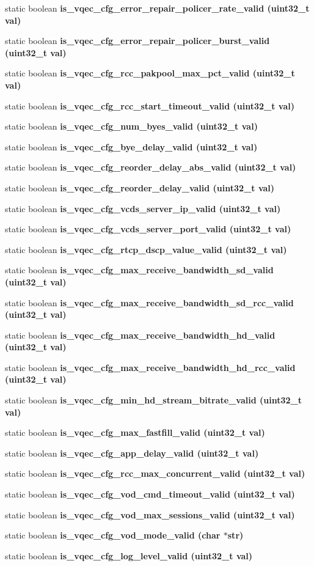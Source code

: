 \begin{CompactItemize}
static boolean \bf{is\_\-vqec\_\-cfg\_\-error\_\-repair\_\-policer\_\-rate\_\-valid} (uint32\_\-t val)
\item 
static boolean \bf{is\_\-vqec\_\-cfg\_\-error\_\-repair\_\-policer\_\-burst\_\-valid} (uint32\_\-t val)
\item 
static boolean \bf{is\_\-vqec\_\-cfg\_\-rcc\_\-pakpool\_\-max\_\-pct\_\-valid} (uint32\_\-t val)
\item 
static boolean \bf{is\_\-vqec\_\-cfg\_\-rcc\_\-start\_\-timeout\_\-valid} (uint32\_\-t val)
\item 
static boolean \bf{is\_\-vqec\_\-cfg\_\-num\_\-byes\_\-valid} (uint32\_\-t val)
\item 
static boolean \bf{is\_\-vqec\_\-cfg\_\-bye\_\-delay\_\-valid} (uint32\_\-t val)
\item 
static boolean \bf{is\_\-vqec\_\-cfg\_\-reorder\_\-delay\_\-abs\_\-valid} (uint32\_\-t val)
\item 
static boolean \bf{is\_\-vqec\_\-cfg\_\-reorder\_\-delay\_\-valid} (uint32\_\-t val)
\item 
static boolean \bf{is\_\-vqec\_\-cfg\_\-vcds\_\-server\_\-ip\_\-valid} (uint32\_\-t val)
\item 
static boolean \bf{is\_\-vqec\_\-cfg\_\-vcds\_\-server\_\-port\_\-valid} (uint32\_\-t val)
\item 
static boolean \bf{is\_\-vqec\_\-cfg\_\-rtcp\_\-dscp\_\-value\_\-valid} (uint32\_\-t val)
\item 
static boolean \bf{is\_\-vqec\_\-cfg\_\-max\_\-receive\_\-bandwidth\_\-sd\_\-valid} (uint32\_\-t val)
\item 
static boolean \bf{is\_\-vqec\_\-cfg\_\-max\_\-receive\_\-bandwidth\_\-sd\_\-rcc\_\-valid} (uint32\_\-t val)
\item 
static boolean \bf{is\_\-vqec\_\-cfg\_\-max\_\-receive\_\-bandwidth\_\-hd\_\-valid} (uint32\_\-t val)
\item 
static boolean \bf{is\_\-vqec\_\-cfg\_\-max\_\-receive\_\-bandwidth\_\-hd\_\-rcc\_\-valid} (uint32\_\-t val)
\item 
static boolean \bf{is\_\-vqec\_\-cfg\_\-min\_\-hd\_\-stream\_\-bitrate\_\-valid} (uint32\_\-t val)
\item 
static boolean \bf{is\_\-vqec\_\-cfg\_\-max\_\-fastfill\_\-valid} (uint32\_\-t val)
\item 
static boolean \bf{is\_\-vqec\_\-cfg\_\-app\_\-delay\_\-valid} (uint32\_\-t val)
\item 
static boolean \bf{is\_\-vqec\_\-cfg\_\-rcc\_\-max\_\-concurrent\_\-valid} (uint32\_\-t val)
\item 
static boolean \bf{is\_\-vqec\_\-cfg\_\-vod\_\-cmd\_\-timeout\_\-valid} (uint32\_\-t val)
\item 
static boolean \bf{is\_\-vqec\_\-cfg\_\-vod\_\-max\_\-sessions\_\-valid} (uint32\_\-t val)
\item 
static boolean \bf{is\_\-vqec\_\-cfg\_\-vod\_\-mode\_\-valid} (char $\ast$str)
\item 
static boolean \bf{is\_\-vqec\_\-cfg\_\-log\_\-level\_\-valid} (uint32\_\-t val)
\end{CompactItemize}


